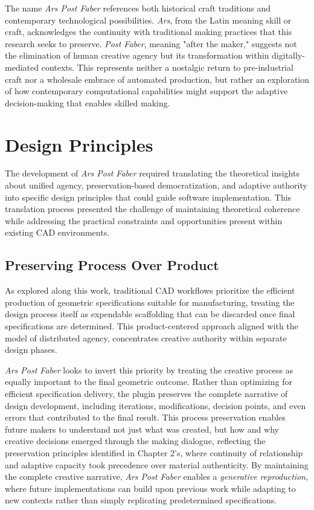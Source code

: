 \vspace{0.5cm}

The name \textit{Ars Post Faber} references both historical craft traditions and contemporary technological possibilities. \textit{Ars}, from the Latin meaning skill or craft, acknowledges the continuity with traditional making practices that this research seeks to preserve. \textit{Post Faber}, meaning "after the maker," suggests not the elimination of human creative agency but its transformation within digitally-mediated contexts. This represents neither a nostalgic return to pre-industrial craft nor a wholesale embrace of automated production, but rather an exploration of how contemporary computational capabilities might support the adaptive decision-making that enables skilled making.

\section{Design Principles}

The development of \textit{Ars Post Faber} required translating the theoretical insights about unified agency, preservation-based democratization, and adaptive authority into specific design principles that could guide software implementation. This translation process presented the challenge of maintaining theoretical coherence while addressing the practical constraints and opportunities present within existing CAD environments.

\subsection{Preserving Process Over Product}

As explored along this work, traditional CAD workflows prioritize the efficient production of geometric specifications suitable for manufacturing, treating the design process itself as expendable scaffolding that can be discarded once final specifications are determined. This product-centered approach aligned with the model of distributed agency, concentrates creative authority within separate design phases.

\vspace{0.5cm}

\textit{Ars Post Faber} looks to invert this priority by treating the creative process as equally important to the final geometric outcome. Rather than optimizing for efficient specification delivery, the plugin preserves the complete narrative of design development, including iterations, modifications, decision points, and even errors that contributed to the final result. This process preservation enables future makers to understand not just what was created, but how and why creative decisions emerged through the making dialogue, reflecting the preservation principles identified in Chapter 2's, where continuity of relationship and adaptive capacity took precedence over material authenticity. By maintaining the complete creative narrative, \textit{Ars Post Faber} enables a \textit{generative reproduction}, where future implementations can build upon previous work while adapting to new contexts rather than simply replicating predetermined specifications.

